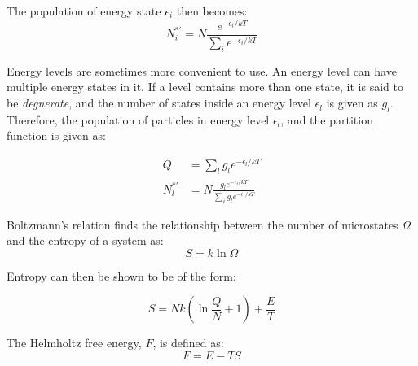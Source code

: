 \documentclass[10pt]{article}
\begin{document}
\begin{flushleft}
\begin{definition}
    The population of energy state $\epsilon_i$ then becomes:
    \begin{equation}
        N_i^{*'} = N \frac{ e^{-\epsilon_i / kT}}{\sum_i e^{-\epsilon_i / kT}}
    \end{equation}    
\end{definition}

\begin{definition}
    Energy levels are sometimes more convenient to use. An energy level can have multiple energy states in it. If a level contains more than one state, it is said to be \textit{degnerate}, and the number of states inside an energy level $\epsilon_l$ is given as $g_l$. Therefore, the population of particles in energy level $\epsilon_l$, and the partition function is given as:

    \begin{align}
        Q &= \sum_l g_l e^{-\epsilon_l / kT}
        \\ N_l^{*'} &= N \frac{ g_l e^{-\epsilon_l / kT}}{\sum_i g_l e^{-\epsilon_i / kT}}
    \end{align}
\end{definition}

\begin{definition}
    Boltzmann's relation finds the relationship between the number of microstates $\Omega$ and the entropy of a system as:
    \begin{equation}
        S = k \ln \Omega
    \end{equation}
\end{definition}

\begin{definition}[Entropy]

    Entropy can then be shown to be of the form:

    \begin{equation}
        S = Nk \left( \ln \frac{Q}{N} + 1 \right) + \frac{E}{T}
    \end{equation}
    
\end{definition}


\begin{definition}
    The Helmholtz free energy, $F$, is defined as:
    \begin{equation}
        F = E - TS \label{Helmholtz}
    \end{equation}


\end{definition}
\end{flushleft}
\end{document}

